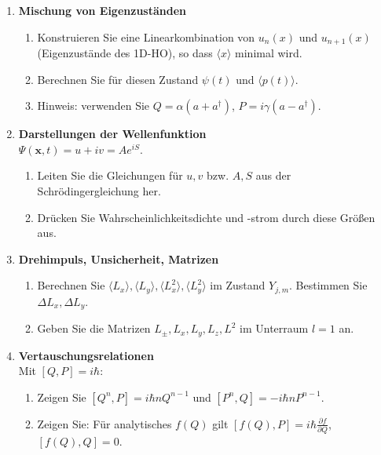 \documentclass[11pt,a4paper]{article}
\begin{document}
\begin{enumerate}
\item \textbf{Mischung von Eigenzuständen}\\
\begin{enumerate}
  \item Konstruieren Sie eine Linearkombination von $u_n(x)$ und $u_{n+1}(x)$ (Eigenzustände des 1D-HO), so dass $\langle x\rangle$ minimal wird.
  \item Berechnen Sie für diesen Zustand $\psi(t)$ und $\langle p(t)\rangle$.
  \item Hinweis: verwenden Sie $Q=\alpha(a+a^\dagger)$, $P=i\gamma(a-a^\dagger)$.
\end{enumerate}

\item \textbf{Darstellungen der Wellenfunktion}\\
\(\Psi(\mathbf x,t)=u+iv=Ae^{iS}\).
\begin{enumerate}
  \item Leiten Sie die Gleichungen für $u,v$ bzw. $A,S$ aus der Schrödingergleichung her.
  \item Drücken Sie Wahrscheinlichkeitsdichte und -strom durch diese Größen aus.
\end{enumerate}

\item \textbf{Drehimpuls, Unsicherheit, Matrizen}\\
\begin{enumerate}
  \item Berechnen Sie $\langle L_x\rangle,\langle L_y\rangle,\langle L_x^2\rangle,\langle L_y^2\rangle$ im Zustand $Y_{j,m}$. Bestimmen Sie $\Delta L_x, \Delta L_y$.
  \item Geben Sie die Matrizen $L_\pm,L_x,L_y,L_z,L^2$ im Unterraum $l=1$ an.
\end{enumerate}

\item \textbf{Vertauschungsrelationen}\\
Mit $[Q,P]=i\hbar$:
\begin{enumerate}
  \item Zeigen Sie $[Q^n,P]=i\hbar n Q^{n-1}$ und $[P^n,Q]=-i\hbar n P^{n-1}$.
  \item Zeigen Sie: Für analytisches $f(Q)$ gilt $[f(Q),P]=i\hbar \tfrac{\partial f}{\partial Q}$, $[f(Q),Q]=0$.
\end{enumerate}

\end{enumerate}


\pagebreak
\end{document}
